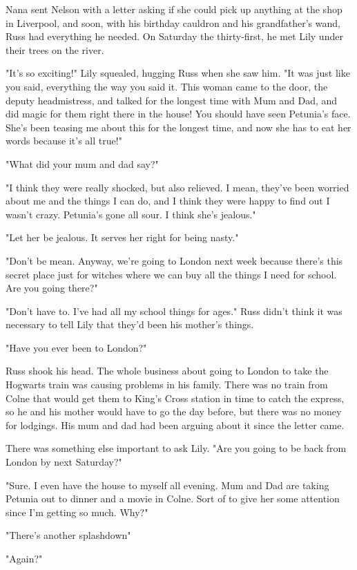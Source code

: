 Nana sent Nelson with a letter asking if she could pick up anything at the shop in Liverpool, and soon, with his birthday cauldron and his grandfather's wand, Russ had everything he needed. On Saturday the thirty-first, he met Lily under their trees on the river.

"It's so exciting!" Lily squealed, hugging Russ when she saw him. "It was just like you said, everything the way you said it. This woman came to the door, the deputy headmistress, and talked for the longest time with Mum and Dad, and did magic for them right there in the house! You should have seen Petunia's face. She's been teasing me about this for the longest time, and now she has to eat her words because it's all true!"

"What did your mum and dad say?"

"I think they were really shocked, but also relieved. I mean, they've been worried about me and the things I can do, and I think they were happy to find out I wasn't crazy. Petunia's gone all sour. I think she's jealous."

"Let her be jealous. It serves her right for being nasty."

"Don't be mean. Anyway, we're going to London next week because there's this secret place just for witches where we can buy all the things I need for school. Are you going there?"

"Don't have to. I've had all my school things for ages." Russ didn't think it was necessary to tell Lily that they'd been his mother's things.

"Have you ever been to London?"

Russ shook his head. The whole business about going to London to take the Hogwarts train was causing problems in his family. There was no train from Colne that would get them to King's Cross station in time to catch the express, so he and his mother would have to go the day before, but there was no money for lodgings. His mum and dad had been arguing about it since the letter came.

There was something else important to ask Lily. "Are you going to be back from London by next Saturday?"

"Sure. I even have the house to myself all evening. Mum and Dad are taking Petunia out to dinner and a movie in Colne. Sort of to give her some attention since I'm getting so much. Why?"

"There's another splashdown{\el}"

"Again?"

